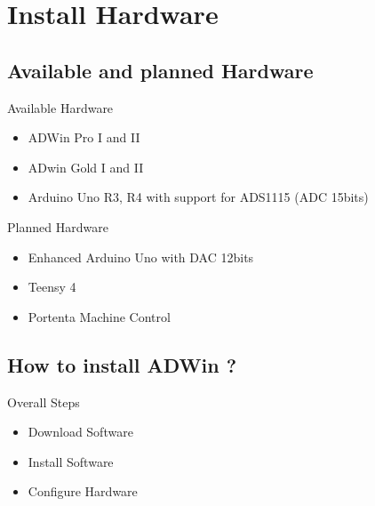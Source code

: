 \documentclass[a4paper,11pt]{beamer}
\begin{document}
\section{Install Hardware}
\subsection{Available and planned Hardware}
\begin{frame}[containsverbatim]

\begin{block}{Available Hardware}
    \begin{itemize}
        \item ADWin Pro I and II
        \item ADwin Gold I and II
        \item Arduino Uno R3, R4 with support for ADS1115 (ADC 15bits)
    \end{itemize}
\end{block}

\begin{alertblock}{Planned Hardware}
    \begin{itemize}
        \item Enhanced Arduino Uno with DAC 12bits
        \item Teensy 4
        \item Portenta Machine Control
    \end{itemize}
\end{alertblock}
\end{frame}

\subsection{How to install ADWin ?}
\begin{frame}[containsverbatim]
\begin{block}{Overall Steps}
    \begin{itemize}
        \item Download Software
        \item Install Software
        \item Configure Hardware
    \end{itemize}
\end{block}
\end{frame}
\end{document}
